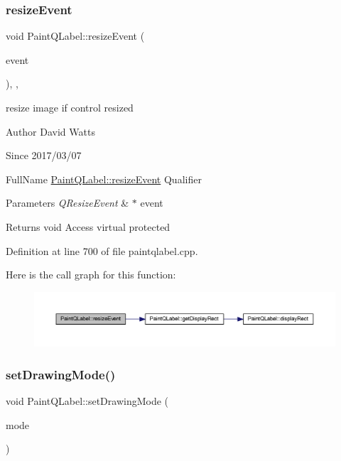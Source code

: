\subsubsection{\texorpdfstring{resize\+Event}{resizeEvent}}
{\footnotesize\ttfamily void Paint\+Q\+Label\+::resize\+Event (\begin{DoxyParamCaption}\item[{Q\+Resize\+Event $\ast$}]{event }\end{DoxyParamCaption})\hspace{0.3cm}{\ttfamily [protected]}, {\ttfamily [virtual]}, {\ttfamily [slot]}}

resize image if control resized

\begin{DoxyAuthor}{Author}
David Watts 
\end{DoxyAuthor}
\begin{DoxySince}{Since}
2017/03/07
\end{DoxySince}
Full\+Name \hyperlink{class_paint_q_label_aec6344135e411064b52d5376650b48ef}{Paint\+Q\+Label\+::resize\+Event} Qualifier 
\begin{DoxyParams}{Parameters}
{\em Q\+Resize\+Event} & $\ast$ event \\
\hline
\end{DoxyParams}
\begin{DoxyReturn}{Returns}
void Access virtual protected 
\end{DoxyReturn}


Definition at line 700 of file paintqlabel.\+cpp.

Here is the call graph for this function\+:
\nopagebreak
\begin{figure}[H]
\begin{center}
\leavevmode
\includegraphics[width=350pt]{class_paint_q_label_aec6344135e411064b52d5376650b48ef_cgraph}
\end{center}
\end{figure}
\mbox{\label{class_paint_q_label_a15478ad03c1c6254c3474ab8deb0428f}} 
\subsubsection{\texorpdfstring{set\+Drawing\+Mode()}{setDrawingMode()}}
{\footnotesize\ttfamily void Paint\+Q\+Label\+::set\+Drawing\+Mode (\begin{DoxyParamCaption}\item[{drawing\+Mode\+::drawing\+Mode}]{mode }\end{DoxyParamCaption})}

